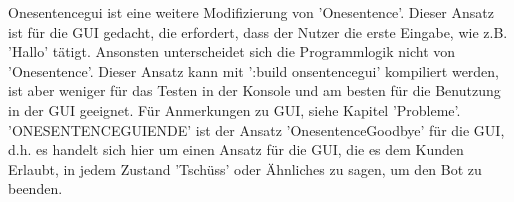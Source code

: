 Onesentencegui ist eine weitere Modifizierung von 'Onesentence'. Dieser Ansatz ist für die GUI gedacht, die erfordert, dass der Nutzer die erste Eingabe, wie z.B. 'Hallo' tätigt. Ansonsten unterscheidet sich die Programmlogik nicht von 'Onesentence'. Dieser Ansatz kann mit ':build onsentencegui' kompiliert werden, ist aber weniger für das Testen in der Konsole und am besten für die Benutzung in der GUI geeignet. Für Anmerkungen zu GUI, siehe Kapitel 'Probleme'. 'ONESENTENCEGUIENDE' ist der Ansatz 'OnesentenceGoodbye' für die GUI, d.h. es handelt sich hier um einen Ansatz für die GUI, die es dem Kunden Erlaubt, in jedem Zustand 'Tschüss' oder Ähnliches zu sagen, um den Bot zu beenden. 

